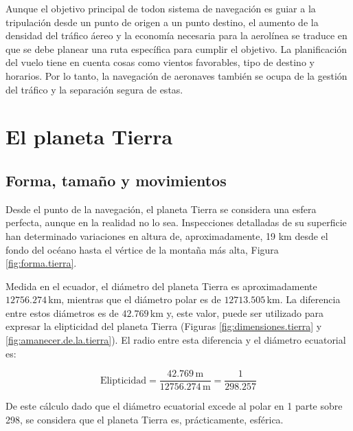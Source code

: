 Aunque el objetivo principal de todon sistema de navegaci\'on es guiar a la tripulación desde un punto de origen a  un punto destino, el aumento de la densidad del tráfico \'aereo y la economía necesaria para la aerolínea se traduce en que se debe planear una ruta específica para cumplir el objetivo. La planificación del vuelo tiene en cuenta cosas como vientos favorables, tipo de destino y horarios. Por lo tanto, la navegación de aeronaves también se ocupa de la gestión del tráfico y la separación segura de estas. 


\section{El planeta Tierra}
\label{sec:la.tierra}

\subsection{Forma, tama\~no y movimientos}
\label{sec:forma.y.tamanio}

Desde el punto de la navegaci\'on, el planeta Tierra se considera una esfera perfecta, aunque en la realidad no lo sea. Inspecciones detalladas de su superficie han determinado variaciones en altura de, aproximadamente, 19 km desde el fondo del oc\'eano hasta el v\'ertice de la monta\~na m\'as alta, Figura \ref{fig:forma.tierra}.

Medida en el ecuador, el di\'ametro del planeta  Tierra es aproximadamente $12756.274$\,km, mientras que el di\'ametro polar es de $12713.505$\,km. La diferencia entre estos di\'ametros es de $42.769$\,km y, este valor, puede ser utilizado para expresar la elipticidad del planeta Tierra (Figuras \ref{fig:dimensiones.tierra} y \ref{fig:amanecer.de.la.tierra}). El radio entre esta diferencia y el di\'ametro ecuatorial es:

\[\displaystyle
	\text{Elipticidad} = \frac{42.769 \,\text{m}}{ 12756.274\,\text{m}}
	=\frac{1}{298.257}
\]


De este c\'alculo dado que el di\'ametro ecuatorial excede al polar en 1 parte sobre 298, se considera que el planeta Tierra es, pr\'acticamente, esf\'erica. 


